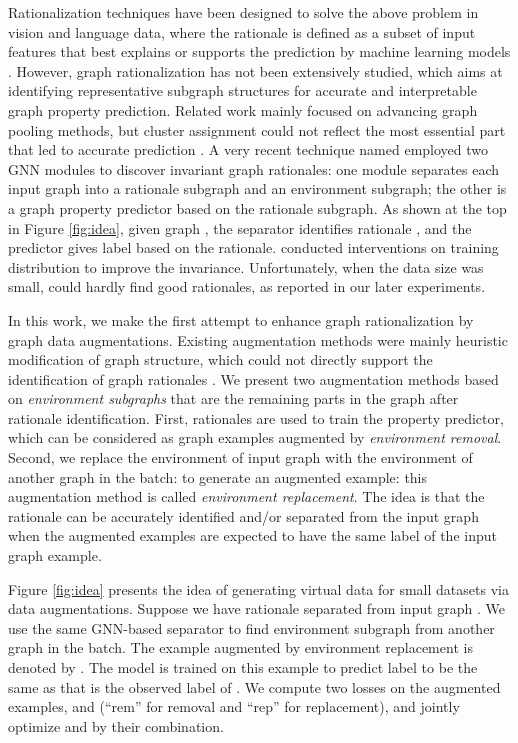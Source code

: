 \documentclass[sigconf]{acmart}
\begin{document}
Rationalization techniques have been designed to solve the above problem in vision and language data, where the rationale is defined as a subset of input features that best explains or supports the prediction by machine learning models \cite{chang2020invariant,arjovsky2019invariant,rosenfeld2021risks}.
However, graph rationalization has not been extensively studied, which aims at identifying representative subgraph structures for accurate and interpretable graph property prediction.
Related work mainly focused on advancing graph pooling methods, but cluster assignment could not reflect the most essential part that led to accurate prediction \cite{mesquita2020rethinking,gao2021graph}.
A very recent technique named \dir \cite{wu2022discovering} employed two GNN modules to discover invariant graph rationales: one module separates each input graph into a rationale subgraph and an environment subgraph; the other is a graph property predictor based on the rationale subgraph. As shown at the top in Figure \ref{fig:idea}, given graph , the separator  identifies rationale , and the predictor  gives label  based on the rationale. \dir conducted interventions on training distribution to improve the invariance. Unfortunately, when the data size was small,  could hardly find good rationales, as reported in our later experiments.

\vspace{0.05in}
In this work, we make the first attempt to enhance graph rationalization by graph data augmentations. Existing augmentation methods were mainly heuristic modification of graph structure, which could not directly support the identification of graph rationales \cite{rong2019dropedge,wang2020graphcrop,wang2020nodeaug,zhao2021data}. We present two augmentation methods based on \emph{environment subgraphs} that are the remaining parts in the graph after rationale identification. First, rationales are used to train the property predictor, which can be considered as graph examples augmented by \emph{environment removal}.
Second, we replace the environment of input graph with the environment of another graph in the batch:
to generate an augmented example: this augmentation method is called \emph{environment replacement}.
The idea is that the rationale can be accurately identified and/or separated from the input graph when the augmented examples are expected to have the same label of the input graph example.

Figure \ref{fig:idea} presents the idea of generating virtual data for small datasets via data augmentations. Suppose we have rationale  separated from input graph . We use the same GNN-based separator to find environment subgraph  from another graph  in the batch.
The example augmented by environment replacement is denoted by . The model is trained on this example to predict label  to be the same as  that is the observed label of .
We compute two losses on the augmented examples,  and  (``rem'' for removal and ``rep'' for replacement), and jointly optimize  and  by their combination.
\end{document}
